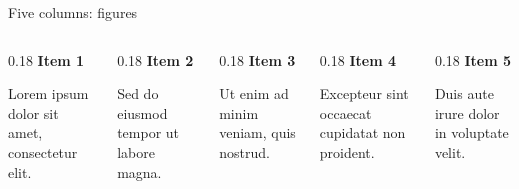 \begin{frame}[t]{Five columns: figures}
    \begin{columns}[T,onlytextwidth]
        \begin{column}{0.18\textwidth}
            \textbf{Item 1}\par\medskip
            \par\medskip Lorem ipsum dolor sit amet, consectetur elit.
        \end{column}
        \begin{column}{0.18\textwidth}
            \textbf{Item 2}\par\medskip
            \par\medskip Sed do eiusmod tempor ut labore magna.
        \end{column}
        \begin{column}{0.18\textwidth}
            \textbf{Item 3}\par\medskip
            \par\medskip Ut enim ad minim veniam, quis nostrud.
        \end{column}
        \begin{column}{0.18\textwidth}
            \textbf{Item 4}\par\medskip
            \par\medskip Excepteur sint occaecat cupidatat non proident.
        \end{column}
        \begin{column}{0.18\textwidth}
            \textbf{Item 5}\par\medskip
            \par\medskip Duis aute irure dolor in voluptate velit.
        \end{column}
    \end{columns}
\end{frame}
